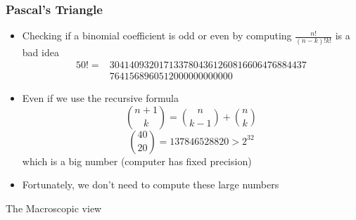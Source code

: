 \documentclass{beamer}
\begin{document}
\begin{frame}
    \frametitle{Pascal's Triangle}
    \begin{itemize}
        \item Checking if a binomial coefficient is odd or even by computing $\frac{n!}{(n-k)!k!}$ is a bad idea
        \begin{align*}
            50! = &3041409320171337804361260816606476884437\\
            &7641568960512000000000000   
        \end{align*}
        \item Even if we use the recursive formula 
        \begin{equation*}
            \binom{n+1}{k}= \binom{n}{k-1} + \binom{n}{k}
        \end{equation*}
        \begin{equation*}
            \binom{40}{20} = 137846528820 > 2^{32}
        \end{equation*}
        which is a big number (computer has fixed precision)
        \item Fortunately, we don't need to compute these large numbers
        \end{itemize}
\end{frame}

\begin{frame}
    \centering 
    \Large
    The Macroscopic view
\end{frame}
\end{document}

